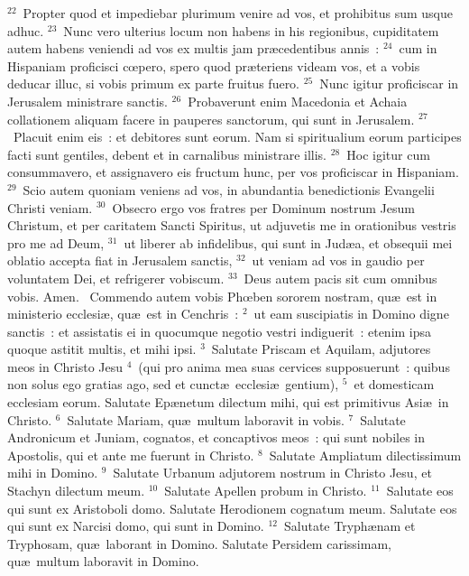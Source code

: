 ${}^{22}$~Propter quod et impediebar plurimum venire ad vos, et prohibitus sum usque adhuc.
${}^{23}$~Nunc vero ulterius locum non habens in his regionibus, cupiditatem autem habens veniendi ad vos ex multis jam pr\ae cedentibus annis~:
${}^{24}$~cum in Hispaniam proficisci cœpero, spero quod pr\ae teriens videam vos, et a vobis deducar illuc, si vobis primum ex parte fruitus fuero.
${}^{25}$~Nunc igitur proficiscar in Jerusalem ministrare sanctis.
${}^{26}$~Probaverunt enim Macedonia et Achaia collationem aliquam facere in pauperes sanctorum, qui sunt in Jerusalem.
${}^{27}$~Placuit enim eis~: et debitores sunt eorum. Nam si spiritualium eorum participes facti sunt gentiles, debent et in carnalibus ministrare illis.
${}^{28}$~Hoc igitur cum consummavero, et assignavero eis fructum hunc, per vos proficiscar in Hispaniam.
${}^{29}$~Scio autem quoniam veniens ad vos, in abundantia benedictionis Evangelii Christi veniam.
${}^{30}$~Obsecro ergo vos fratres per Dominum nostrum Jesum Christum, et per caritatem Sancti Spiritus, ut adjuvetis me in orationibus vestris pro me ad Deum,
${}^{31}$~ut liberer ab infidelibus, qui sunt in Jud\ae a, et obsequii mei oblatio accepta fiat in Jerusalem sanctis,
${}^{32}$~ut veniam ad vos in gaudio per voluntatem Dei, et refrigerer vobiscum.
${}^{33}$~Deus autem pacis sit cum omnibus vobis. Amen.
~Commendo autem vobis Phœben sororem nostram, qu\ae\ est in ministerio ecclesi\ae , qu\ae\ est in Cenchris~:
${}^{2}$~ut eam suscipiatis in Domino digne sanctis~: et assistatis ei in quocumque negotio vestri indiguerit~: etenim ipsa quoque astitit multis, et mihi ipsi.
${}^{3}$~Salutate Priscam et Aquilam, adjutores meos in Christo Jesu
${}^{4}$~(qui pro anima mea suas cervices supposuerunt~: quibus non solus ego gratias ago, sed et cunct\ae\ ecclesi\ae\ gentium),
${}^{5}$~et domesticam ecclesiam eorum. Salutate Ep\ae netum dilectum mihi, qui est primitivus Asi\ae\ in Christo.
${}^{6}$~Salutate Mariam, qu\ae\ multum laboravit in vobis.
${}^{7}$~Salutate Andronicum et Juniam, cognatos, et concaptivos meos~: qui sunt nobiles in Apostolis, qui et ante me fuerunt in Christo.
${}^{8}$~Salutate Ampliatum dilectissimum mihi in Domino.
${}^{9}$~Salutate Urbanum adjutorem nostrum in Christo Jesu, et Stachyn dilectum meum.
${}^{10}$~Salutate Apellen probum in Christo.
${}^{11}$~Salutate eos qui sunt ex Aristoboli domo. Salutate Herodionem cognatum meum. Salutate eos qui sunt ex Narcisi domo, qui sunt in Domino.
${}^{12}$~Salutate Tryph\ae nam et Tryphosam, qu\ae\ laborant in Domino. Salutate Persidem carissimam, qu\ae\ multum laboravit in Domino.
